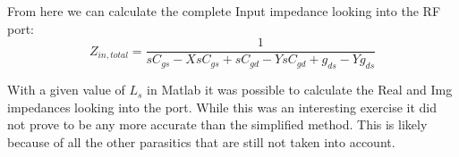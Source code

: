 \documentclass{article}                                                         %
\begin{document}
\begin{appendices}
\vspace{3mm}From here we can calculate the complete Input impedance looking into the RF port:
$$ Z_{in,total} = \dfrac{1}{ sC_{gs}-XsC_{gs}+sC_{gd}-YsC_{gd}+g_{ds}-Yg_{ds} } $$


\vspace{3mm}With a given value of $L_s$ in Matlab it was possible to calculate the Real and Img impedances
looking into the port. While this was an interesting exercise it did not prove to be any more accurate
than the simplified method. This is likely because of all the other parasitics that are still not taken into account.


\end{appendices}
\end{document}
